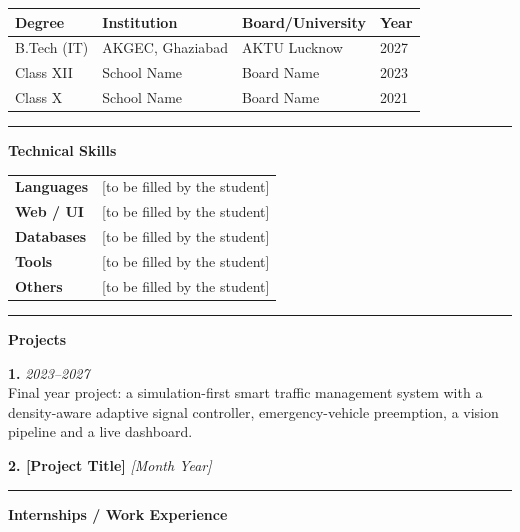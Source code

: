 \begin{tabular}{@{}p{2.5cm}p{5cm}p{3cm}p{1.5cm}@{}}
\toprule
\textbf{Degree} & \textbf{Institution} & \textbf{Board/University} & \textbf{Year} \\
\midrule
B.Tech (IT)    & AKGEC, Ghaziabad       & AKTU Lucknow & 2027 \\
Class XII       & School Name            & Board Name   & 2023 \\
Class X         & School Name            & Board Name   & 2021 \\
\bottomrule
\end{tabular}

\vspace{0.4cm}\hrule\vspace{0.4cm}

\noindent\textbf{Technical Skills}
\vspace{0.2cm}

\begin{tabular}{@{}p{3.5cm}p{9cm}@{}}
\textbf{Languages}   & [to be filled by the student] \\[3pt]
\textbf{Web / UI}    & [to be filled by the student] \\[3pt]
\textbf{Databases}   & [to be filled by the student] \\[3pt]
\textbf{Tools}       & [to be filled by the student] \\[3pt]
\textbf{Others}      & [to be filled by the student] \\
\end{tabular}

\vspace{0.4cm}\hrule\vspace{0.4cm}

\noindent\textbf{Projects}
\vspace{0.2cm}

\noindent\textbf{1. \reporttitle} \hfill \textit{2023--2027}\\
Final year project: a simulation-first smart traffic management system with a density-aware adaptive signal controller, emergency-vehicle preemption, a vision pipeline and a live dashboard.

\noindent\textbf{2. [Project Title]} \hfill \textit{[Month Year]}\\
[Brief one-line description of another project.]

\vspace{0.4cm}\hrule\vspace{0.4cm}

\noindent\textbf{Internships / Work Experience}
\vspace{0.2cm}

